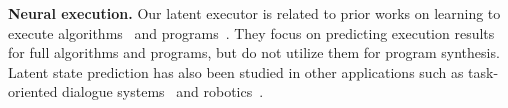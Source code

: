 \textbf{Neural execution.} Our latent executor is related to prior works on learning to execute algorithms~\cite{zaremba2014learning,velivckovic2019neural,yan2020neural} and programs~\cite{bieber2020learning}. They focus on predicting execution results for full algorithms and programs, but do not utilize them for program synthesis. Latent state prediction has also been studied in other applications such as task-oriented dialogue systems~\cite{min2020dsi,zhang2020probabilistic} and robotics~\cite{paxton2019prospection}.

